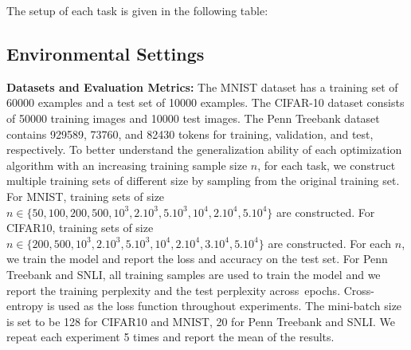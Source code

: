 \documentclass[11pt]{article}
\begin{document}
The setup of each task is given in the following table:
 \begin{table}[H]
 	\centering
 	\label{tab::network_setup}
 \end{table}


\subsection{Environmental Settings}


\textbf{Datasets and Evaluation Metrics:}  The MNIST dataset has a training set of 60000 examples and a test set of 10000 examples. The CIFAR-10 dataset consists of 50000 
training images and 10000 test images. The Penn Treebank dataset contains 929589, 73760, and 82430 tokens for training, validation, and test,  respectively.
To better understand the generalization ability of each optimization algorithm with an increasing training sample size $n$, for each task, we construct multiple training sets of different size by sampling from the original training set. For MNIST, training sets of size $n \in \{50, 100, 200, 500, 10^3, 2.10^3, 5.10^3, 10^4, 2.10^4, 5.10^4 \}$ are constructed. For CIFAR10, training sets of size $n \in \{ 200, 500, 10^3, 2.10^3, 5.10^3, 10^4, 2.10^4,3.10^4, 5.10^4\}$ are constructed. 
For each $n$, we train the model and report the loss and accuracy on the test set.  
For Penn Treebank and SNLI, all training samples are used to train the model and we report the training perplexity and the test perplexity across~epochs. 
Cross-entropy is used as the loss function throughout experiments. The mini-batch size is set to be 128 for CIFAR10 and MNIST, 20 for Penn Treebank and SNLI. 
We repeat each experiment 5 times and report the mean of the results.
\end{document}
